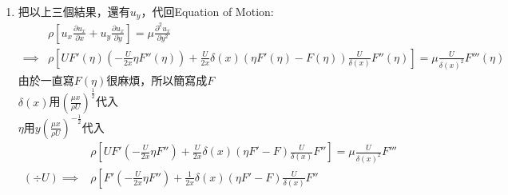 \documentclass[../main.tex]{subfiles}
\begin{document}
\begin{itemize}
\begin{itemize}
\begin{enumerate}
\begin{itemize}
\begin{align}
        &= \frac{U}{y} \eta F''(\eta)
      \end{align}
      \item $\frac{\partial^2 u_x}{\partial y^2}$:
      \begin{align}
        \frac{\partial^2 u_x}{\partial y^2} &= \frac{\partial}{\partial y} \left(
          \frac{\partial u_x}{\partial y}
        \right) \nonumber\\
        &= \frac{\partial}{\partial y} \left(
          \frac{U}{\delta(x)} F''(\eta)
        \right) \nonumber\\
        &= \frac{U}{\delta(x)} \frac{d F''(\eta)}{d \eta} \frac{\partial \eta}{\partial y} \nonumber\\
        & = \frac{U}{\delta(x)^2} F'''(\eta) \nonumber\\
        &= \frac{U\eta^2}{y^2} F'''(\eta)
      \end{align}
    \end{itemize}
    \item 把以上三個結果，還有$u_y$，代回Equation of Motion:
      \begin{align}
        & \rho\left[
          u_x \frac{\partial u_x}{\partial x} +
          u_y \frac{\partial u_x}{\partial y}
        \right] = \mu \frac{\partial^2 u_x}{\partial y^2} \nonumber\\
        \implies & \rho \left[
          U F'(\eta) \left(
            -\frac{U}{2x} \eta F''(\eta)
          \right) +
          \frac{U}{2x}\delta(x) \left(
            \eta F'(\eta) - F(\eta)
          \right) \frac{U}{\delta(x)} F''(\eta)
        \right] = \mu \frac{U}{\delta(x)^2} F'''(\eta)
      \end{align}
      由於一直寫$F(\eta)$很麻煩，所以簡寫成$F$\\
      $\delta(x)$用$\left(
        \frac{\mu x}{\rho U}
      \right)^{\frac{1}{2}}$代入\\
      $\eta$用$y\left(
        \frac{\mu x}{\rho U}
      \right)^{-\frac{1}{2}}$代入
      \begin{align}
         & \rho \left[
          U F' \left(
            -\frac{U}{2x} \eta F''
          \right) +
          \frac{U}{2x}\delta(x) \left(
            \eta F' - F
          \right) \frac{U}{\delta(x)} F''
        \right] = \mu \frac{U}{\delta(x)^2} F''' \nonumber\\
        (\div U) \implies & \rho \left[
          F' \left(
            -\frac{U}{2x} \eta F''
          \right) +
          \frac{1}{2x}\delta(x) \left(
            \eta F' - F
          \right) \frac{U}{\delta(x)} F''

\end{align}
\end{enumerate}
\end{itemize}
\end{itemize}
\end{document}
